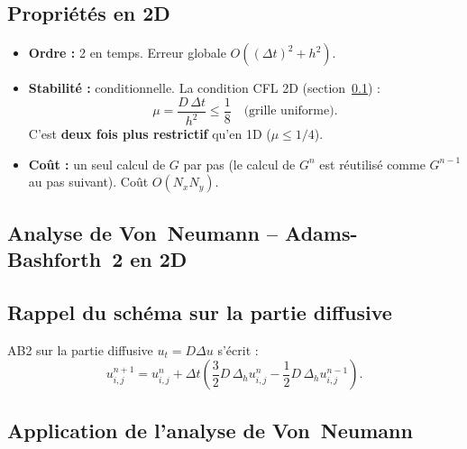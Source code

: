 \documentclass[11pt,a4paper]{report}
\begin{document}
\subsection*{Propri\'et\'es en 2D}

\begin{itemize}[leftmargin=1.5em]
  \item \textbf{Ordre :} 2 en temps. Erreur globale $O((\Delta t)^2+h^2)$.
  \item \textbf{Stabilit\'e :} conditionnelle. La condition CFL 2D (section~\ref{sec:vonneumann_AB2_2D}) :
        \begin{equation}
          \mu = \frac{D\,\Delta t}{h^2} \le \frac{1}{8}
          \quad\text{(grille uniforme)}.
        \end{equation}
        C'est \textbf{deux fois plus restrictif} qu'en 1D ($\mu\le 1/4$).
  \item \textbf{Co\^ut :} un seul calcul de $G$ par pas (le calcul de $G^n$
        est r\'eutilis\'e comme $G^{n-1}$ au pas suivant). Co\^ut $O(N_xN_y)$.
\end{itemize}


\subsection{Analyse de Von~Neumann -- Adams-Bashforth~2 en 2D}
\label{sec:vonneumann_AB2_2D}

\subsection*{Rappel du sch\'ema sur la partie diffusive}

AB2 sur la partie diffusive $u_t=D\Delta u$ s'\'ecrit :
\begin{equation}
  u_{i,j}^{n+1} = u_{i,j}^n
  + \Delta t\!\left(\frac{3}{2}D\,\Delta_h u_{i,j}^n - \frac{1}{2}D\,\Delta_h u_{i,j}^{n-1}\right).
\end{equation}

\subsection*{Application de l'analyse de Von~Neumann}
\end{document}

